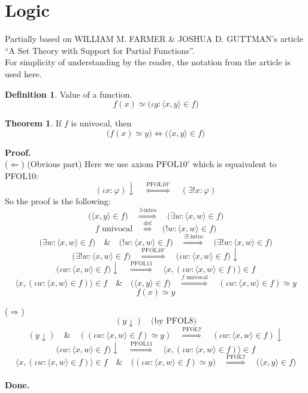 \documentclass[10pt,a4paper]{article}
\theoremstyle{definition}
\newtheorem{definition}{Definition}
\newtheorem{theorem}{Theorem}
\newcommand{\Proof}{\noindent \textbf{Proof.}\\}
\newcommand{\Done}{\noindent \textbf{Done.}\\}
\begin{document}
\section{Logic}
Partially based on WILLIAM M. FARMER \& JOSHUA D. GUTTMAN's article\\
``A Set Theory with Support for Partial Functions''.\\
For simplicity of understanding by the reader, the notation from the article is used here.\\
\begin{definition} Value of a function.
$$f(x) \simeq \big(\iota y: \langle x,y\rangle\in f\big)$$
\end{definition}

\begin{theorem} If $f$ is univocal, then
$$\big(f(x)\simeq y\big)\Leftrightarrow \big(\langle x,y\rangle\in f\big)$$
\end{theorem}
\Proof
($\Leftarrow$) (Obvious part) Here we use axiom PFOL$10'$ which is equaivalent to PFOL10:
$$
(\iota x:\varphi)\downarrow
\quad\overset{\mbox{PFOL10}'}{\Longleftrightarrow}\quad
(\exists!x:\varphi)
$$
So the proof is the following:
$$
\big(\langle x,y\rangle\in f\big)
\quad\overset{\exists\mbox{-intro}}{\Longrightarrow}\quad
\big(\exists w: \langle x,w\rangle\in f\big)
$$
$$
f\mbox{ univocal}
\quad\overset{\mbox{def}}{\Longleftrightarrow}\quad
\big(! w: \langle x,w\rangle\in f\big)
$$
$$
\big(\exists w: \langle x,w\rangle\in f\big)
\quad\&\quad
\big(! w: \langle x,w\rangle\in f\big)
\quad\overset{\exists!\mbox{-intro}}{\Longrightarrow}\quad
\big(\exists! w: \langle x,w\rangle\in f\big)
$$
$$
\big(\exists! w: \langle x,w\rangle\in f\big)
\quad\overset{\mbox{PFOL10}'}{\Longrightarrow}\quad
\big(\iota w: \langle x,w\rangle\in f\big)\downarrow
$$
$$
\big(\iota w: \langle x,w\rangle\in f\big)\downarrow 
\quad\overset{\mbox{PFOL11}}{\Longrightarrow}\quad
\langle x,(\iota w: \langle x,w\rangle\in f)\rangle\in f
$$
$$
\langle x,(\iota w: \langle x,w\rangle\in f)\rangle\in f
\quad\&\quad
\big(\langle x,y\rangle\in f\big)
\quad\overset{f \mbox{ univocal}}{\Longrightarrow}\quad
(\iota w: \langle x,w\rangle\in f) \simeq y
$$
$$
f(x) \simeq y
$$

\noindent($\Rightarrow$)
$$(y\downarrow)\quad\mbox{(by PFOL8)}$$
$$
(y\downarrow)\quad\&\quad((\iota w: \langle x,w\rangle\in f)\simeq y) \quad\overset{\mbox{PFOL7}}{\Longrightarrow}\quad
(\iota w: \langle x,w\rangle\in f)\downarrow $$
$$
\big(\iota w: \langle x,w\rangle\in f\big)\downarrow 
\quad\overset{\mbox{PFOL11}}{\Longrightarrow}\quad
\langle x,(\iota w: \langle x,w\rangle\in f)\rangle\in f
$$
$$
\langle x,(\iota w: \langle x,w\rangle\in f)\rangle\in f
\quad\&\quad
\big((\iota w: \langle x,w\rangle\in f)\simeq y\big)
\quad\overset{\mbox{PFOL7}}{\Longrightarrow}\quad
\big(\langle x, y\rangle\in f\big)
$$
\\
\Done
\end{document}
